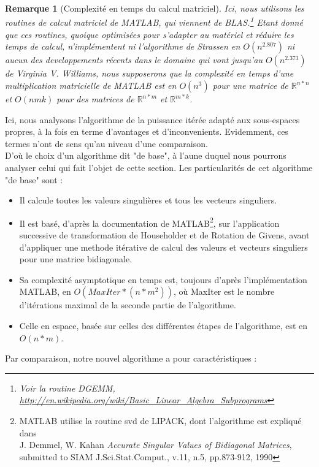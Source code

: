 \documentclass[a4paper,12pt]{article}
\newtheorem*{remark}{Remarque}
\begin{document}
    \begin{remark}[Complexité en temps du calcul matriciel]
    Ici, nous utilisons les routines de calcul matriciel de MATLAB, qui viennent de BLAS.\footnote{Voir la routine DGEMM, \url{http://en.wikipedia.org/wiki/Basic_Linear_Algebra_Subprograms}} Etant donné que ces routines, quoique optimisées pour s'adapter au matériel et réduire les temps de calcul, n'implémentent ni l'algorithme de Strassen en $O(n^{2.807})$ ni aucun des developpements récents dans le domaine qui vont jusqu'au $O(n^{2.373})$ de Virginia V. Williams, nous supposerons que la complexité en temps d'une multiplication matricielle de MATLAB est en $O(n^3)$ pour une matrice de $\mathbb{R}^{n*n}$ et $O(nmk)$ pour des matrices de $\mathbb{R}^{n*m}$ et $\mathbb{R}^{m*k}$.
    \end{remark}

    Ici, nous analysons l'algorithme de la puissance itérée adapté aux sous-espaces propres, à la fois en terme d'avantages et d'inconvenients. Evidemment, ces termes n'ont de sens qu'au niveau d'une comparaison. \\
    D'où le choix d'un algorithme dit "de base", à l'aune duquel nous pourrons analyser celui qui fait l'objet de cette section.
    Les particularités de cet algorithme "de base" sont : \\

        \begin{itemize}
            \item Il calcule toutes les valeurs singulières et tous les vecteurs singuliers.
            \item Il est basé, d'après la documentation de MATLAB\footnote{MATLAB utilise la routine svd de LIPACK, dont l'algorithme est expliqué dans \\    J. Demmel, W. Kahan \textit{Accurate Singular Values of Bidiagonal Matrices}, submitted to SIAM J.Sci.Stat.Comput., v.11, n.5, pp.873-912, 1990}, sur l'application successive de transformation de Householder et de Rotation de Givens, avant d'appliquer une methode itérative de calcul des valeurs et vecteurs singuliers pour une matrice bidiagonale.
            \item Sa complexité asymptotique en temps est, toujours d'après l'implémentation MATLAB, en $O(MaxIter*(n*m^2))$, où MaxIter est le nombre d'itérations maximal de la seconde partie de l'algorithme.
            \item Celle en espace, basée sur celles des différentes étapes de l'algorithme, est en $O(n*m)$.
        \end{itemize}
\bigskip
    Par comparaison, notre nouvel algorithme a pour caractéristiques : \\
\end{document}
